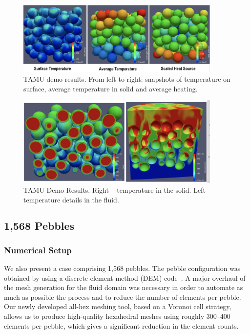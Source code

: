 \begin{figure}[!h]
\centering
\includegraphics[clip=true,width=0.9\textwidth]{Figures/demo_r1}
\caption{TAMU demo results. From left to right: snapshots of temperature on surface, average temperature in solid and average heating.}
\label{f:dtamu1}
\end{figure}

\begin{figure}[!h]
\centering
\includegraphics[clip=true,width=0.9\textwidth]{Figures/demo_r2}
\caption{TAMU Demo Results. Right -- temperature in the solid. Left -- temperature details in the fluid.}
\label{f:dtamu2}
\end{figure}

\subsection{1,568 Pebbles}

\subsubsection{Numerical Setup}

We also present a case comprising 1,568 pebbles. The pebble configuration was
obtained by using a discrete element method (DEM) code~\cite{projectChronoWebSite}.
A major overhaul of the mesh generation for the fluid domain was necessary
in order to automate as much as possible the process and to reduce the number of elements
per pebble. Our newly developed all-hex meshing tool, based on a Voronoi cell strategy,
allows us to produce high-quality hexahedral meshes using roughly 300--400 elements per pebble,
which gives a significant reduction in the element counts.

